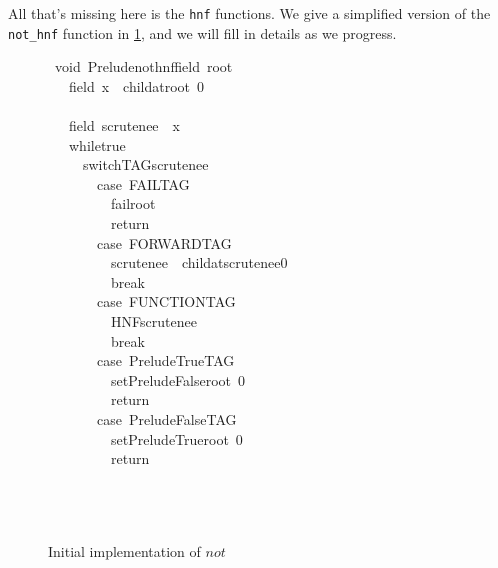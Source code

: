 \documentclass{book}
\theoremstyle{definition}
\newcommand{\Varid}[1]{\mathit{#1}}
\begin{document}
All that's missing here is the \texttt{hnf} functions.
We give a simplified version of the \texttt{not\_hnf} function in \ref{fig:notInit},
and we will fill in details as we progress.

\begin{figure}
\begin{tabbing}\ttfamily
~void~Preludenothnffield~root~\\
\ttfamily ~~~field~x~~childatroot~0\\
\ttfamily ~\\
\ttfamily ~~~field~scrutenee~~x\\
\ttfamily ~~~whiletrue~\\
\ttfamily ~~~~~switchTAGscrutenee~\\
\ttfamily ~~~~~~~case~FAILTAG\\
\ttfamily ~~~~~~~~~failroot\\
\ttfamily ~~~~~~~~~return\\
\ttfamily ~~~~~~~case~FORWARDTAG\\
\ttfamily ~~~~~~~~~scrutenee~~childatscrutenee0\\
\ttfamily ~~~~~~~~~break\\
\ttfamily ~~~~~~~case~FUNCTIONTAG\\
\ttfamily ~~~~~~~~~HNFscrutenee\\
\ttfamily ~~~~~~~~~break\\
\ttfamily ~~~~~~~case~PreludeTrueTAG\\
\ttfamily ~~~~~~~~~setPreludeFalseroot~0\\
\ttfamily ~~~~~~~~~return\\
\ttfamily ~~~~~~~case~PreludeFalseTAG\\
\ttfamily ~~~~~~~~~setPreludeTrueroot~0\\
\ttfamily ~~~~~~~~~return\\
\ttfamily ~~~~~\\
\ttfamily ~~~\\
\ttfamily ~
\end{tabbing}
\caption{Initial implementation of \ensuremath{\Varid{not}}}
\label{fig:notInit}
\end{figure}
\end{document}
